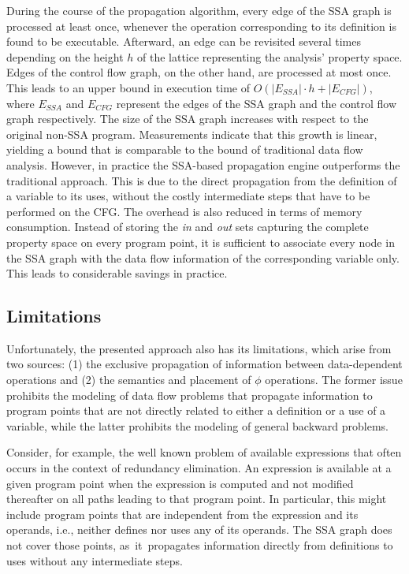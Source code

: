 During the course of the propagation algorithm, every edge of the SSA graph is
processed at least once, whenever the operation corresponding to its definition
is found to be executable. Afterward, an edge can be revisited several times
depending on the height $h$ of the lattice representing the analysis' property
space. Edges of the control flow graph, on the other hand, are processed at most
once. This leads to an upper bound in execution time of $O(|E_{SSA}| \cdot h +
|E_{CFG}|)$, where $E_{SSA}$ and $E_{CFG}$ represent the edges of the SSA graph
and the control flow graph respectively. The size of the
SSA graph increases with respect to the original non-SSA program. Measurements
indicate that this growth is linear, yielding a
bound that is comparable to the bound of traditional data flow analysis.
However, in practice the SSA-based propagation engine outperforms the
traditional approach. This is  due to the direct propagation from the definition
of a variable to its uses, without the costly intermediate steps that have to be
performed on the CFG. The overhead is also reduced in terms of memory
consumption. Instead of storing the \emph{in} and \emph{out} sets capturing the
complete property space on every program point, it is sufficient to
associate every node in the SSA graph with the data flow information of the
corresponding variable only. This leads to considerable savings in practice.

\subsection{Limitations}

Unfortunately, the presented approach also has its limitations, which arise from
two sources: (1) the exclusive
propagation of information between data-dependent operations and (2) the
semantics and placement of $\phi$ operations. The former issue prohibits the
modeling of data flow problems that propagate information to program points that
are not directly related to either a definition or a use of a variable, while
the latter prohibits the modeling of general backward problems.

Consider, for example, the well known problem of available
expressions that often occurs in the context of
redundancy elimination. An expression is available at a given program point when
the expression is computed and not modified thereafter on all paths leading to
that program point. In particular, this might include program points that are
independent from the expression and its operands, i.e., neither defines nor uses
any of its operands. The SSA graph does not cover those points,
as~it~propagates information directly from definitions to uses without any
intermediate steps.

